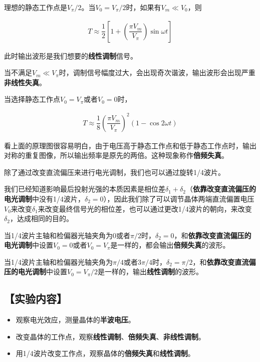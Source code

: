 \documentclass{ctexart}
\let\oldsubsection\subsection
\renewcommand{\subsection}[1]{\oldsubsection{\!\!\!\!\!\!【#1】}}
\begin{document}
理想的静态工作点是$V_{\pi} / 2$。当$V_0 = V_{\pi} / 2$时，如果有$V_m \ll V_0$，则

\begin{equation*}
  \begin{aligned}
    T \approx \dfrac{1}{2} \left[ 1 + \left( \dfrac{\pi V_m}{V_{\pi}}  \right) \sin \omega t \right]  
  \end{aligned}
\end{equation*}

此时输出波形是我们想要的\textbf{线性调制}信号。

当不满足$V_m \ll V_{\pi}$时，调制信号幅度过大，会出现奇次谐波，输出波形会出现严重\textbf{非线性失真}。

当选择静态工作点$V_0 = V_\pi$或者$V_0 = 0$时，

\begin{equation*}
  \begin{aligned}
    T \approx \dfrac{1}{8} \left( \dfrac{\pi V_m}{V_\pi}  \right)^2 \left( 1 - \cos 2 \omega t \right) 
  \end{aligned}
\end{equation*}

看上面的原理图很容易明白，由于电压高于静态工作点和低于静态工作点时，输出对称的重复图像，所以输出频率是原先的两倍。这种现象称作\textbf{倍频失真}。

除了通过改变直流偏压来进行电光调制，我们也可以通过旋转1/4波片。

我们已经知道影响最后投射光强的本质因素是相位差$\delta_1 + \delta_2$（\textbf{依靠改变直流偏压的电光调制}中没有1/4波片，$\delta_2 = 0$），因此我们除了可以调节晶体两端直流偏置电压$V_0$来改变$\delta_1$来改变最终信号光的相位差，也可以通过更改1/4波片的朝向，来改变$\delta_2$，达成相同的目的。

当1/4波片主轴和检偏器光轴夹角为$0$或者$\pi/2$时，$\delta_2 = 0$，和\textbf{依靠改变直流偏压的电光调制}中设置$V_0 = 0$或者$V_0 = V_{\pi}$是一样的，都会输出\textbf{倍频失真}的波形。

当1/4波片主轴和检偏器光轴夹角为$\pi/4$或者$3\pi/4$时，$\delta_2 = \pi/2$，和\textbf{依靠改变直流偏压的电光调制}中设置$V_0 = V_{\pi}/2$是一样的，输出\textbf{线性调制}的波形。
\subsection{实验内容}

\begin{itemize}
\item 观察电光效应，测量晶体的\textbf{半波电压}。
\item 改变晶体的工作点，观察\textbf{线性调制}、\textbf{倍频失真}、\textbf{非线性调制}。
\item 用1/4波片改变工作点，观察晶体的\textbf{倍频失真}和\textbf{线性调制}。
\end{itemize}
\end{document}
